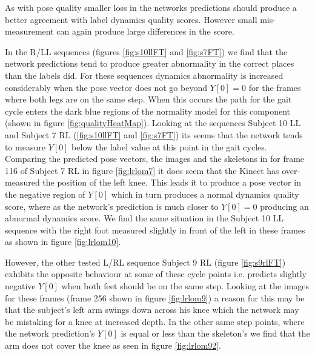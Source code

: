 \documentclass[11pt]{article} %
\begin{document}
As with pose quality smaller loss in the networks predictions should produce a better agreement with label dynamics quality scores. However small mis-measurement can again produce large differences in the score. 

In the R/LL sequences (figures \ref{fig:s10llFT} and \ref{fig:s7FT}) we find that the network predictions tend to produce greater abnormality in the correct places than the labels did. For these sequences dynamics abnormality is increased considerably when the pose vector does not go beyond $Y[0]=0$ for the frames where both legs are on the same step. When this occurs the path for the gait cycle enters the dark blue regions of the normality model for this component (shown in figure \ref{fig:qualityHeatMap}). Looking at the sequences Subject 10 LL and Subject 7 RL (\ref{fig:s10llFT} and \ref{fig:s7FT}) its seems that the network tends to measure $Y[0]$ below the label value at this point in the gait cycles. Comparing the predicted pose vectors, the images and the skeletons in for frame 116 of Subject 7 RL in figure \ref{fig:lrlom7} it does seem that the Kinect has over-measured the position of the left knee. This leads it to produce a pose vector in the negative region of $Y[0]$ which in turn produces a normal dynamics quality score, where as the network's prediction is much closer to $Y[0]=0$ producing an abnormal dynamics score. We find the same situation in the Subject 10 LL sequence with the right foot measured slightly in front of the left in these frames as shown in figure \ref{fig:lrlom10}. 

However, the other tested L/RL sequence Subject 9 RL (figure \ref{fig:s9rlFT}) exhibits the opposite behaviour at some of these cycle points i.e. predicts slightly negative $Y[0]$ when both feet should be on the same step. Looking at the images for these frames (frame 256 shown in figure \ref{fig:lrlom9}) a reason for this may be that the subject's left arm swings down across his knee which the network may be mistaking for a knee at increased depth. In the other same step points, where the network prediction's $Y[0]$ is equal or less than the skeleton's we find that the arm does not cover the knee as seen in figure \ref{fig:lrlom92}.
 
\end{document}
